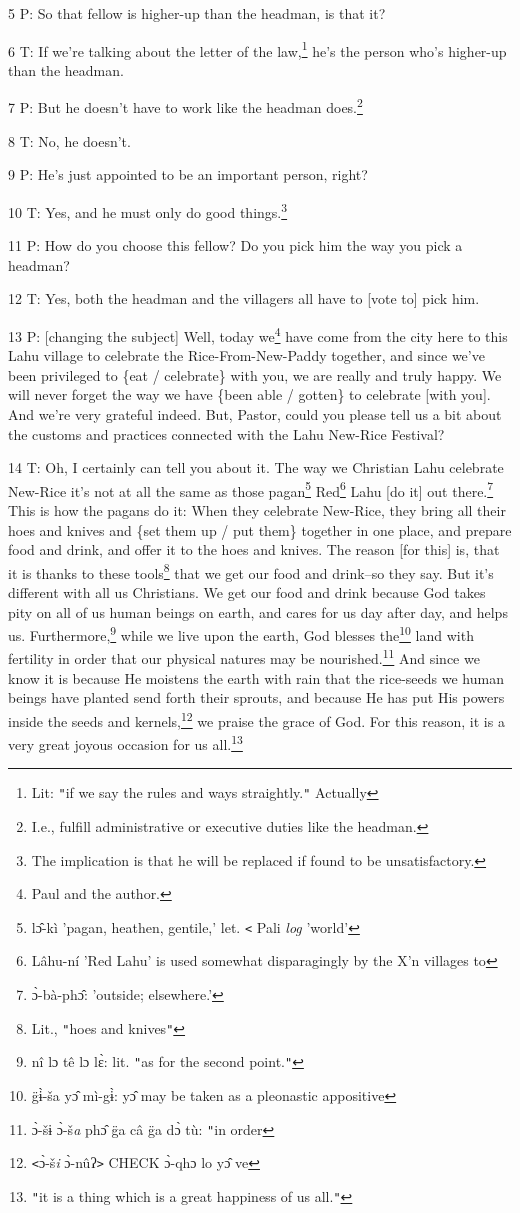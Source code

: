 5 P: So that fellow is higher-up than the headman, is that it?

6 T: If we're talking about the letter of the law,\footnote{Lit: \texttt{"}if we say the rules and ways straightly.\texttt{"} Actually} he's the person who's higher-up
than the headman.

7 P: But he doesn't have to work like the headman does.\footnote{I.e., fulfill administrative or executive duties like the headman.}

8 T: No, he doesn't.

9 P: He's just appointed to be an important person, right?

10 T: Yes, and he must only do good things.\footnote{The implication is that he will be replaced if found to be unsatisfactory.}

11 P: How do you choose this fellow? Do you pick him the way you pick a headman?

12 T: Yes, both the headman and the villagers all have to [vote to] pick him.

13 P: [changing the subject] Well, today we\footnote{Paul and the author.} have come from the city here to
this Lahu village to celebrate the Rice-From-New-Paddy together, and since we've
been privileged to \{eat / celebrate\} with you, we are really and truly happy.
We will never forget the way we have \{been able / gotten\} to celebrate [with
you]. And we're very grateful indeed. But, Pastor, could you please tell us a bit
about the customs and practices connected with the Lahu New-Rice Festival?

14 T: Oh, I certainly can tell you about it. The way we Christian Lahu celebrate
New-Rice it's not at all the same as those pagan\footnote{lɔ̂-kì 'pagan, heathen, gentile,' let. \texttt{<} Pali \textit{log} 'world'} Red\footnote{Lâhu-ní 'Red Lahu' is used somewhat disparagingly by the X'n villages to} Lahu [do it] out there.\footnote{ɔ̀-bà-phɔ̂: 'outside; elsewhere.'}
This is how the pagans do it: When they celebrate New-Rice, they bring all their
hoes and knives and \{set them up / put them\} together in one place, and prepare
food and drink, and offer it to the hoes and knives. The reason [for this] is,
that it is thanks to these tools\footnote{Lit., \texttt{"}hoes and knives\texttt{"}} that we get our food and drink--so they say.
But it's different with all us Christians. We get our food and drink because God
takes pity on all of us human beings on earth, and cares for us day after day,
and helps us. Furthermore,\footnote{nî lɔ tê lɔ lɛ̀: lit. \texttt{"}as for the second point.\texttt{"}} while we live upon the earth, God blesses the\footnote{g̈ɨ̀-ša yɔ̂ mì-gɨ̀: yɔ̂ may be taken as a pleonastic appositive}
land with fertility in order that our physical natures may be nourished.\footnote{ɔ̀-šɨ ɔ̀-š\emph{a} phɔ̂ g̈a câ g̈a dɔ̀ tù: \texttt{"}in order} And
since we know it is because He moistens the earth with rain that the rice-seeds
we human beings have planted send forth their sprouts, and because He has put His
powers inside the seeds and kernels,\footnote{\texttt{<}ɔ̀-š\emph{i} ɔ̀-nûʔ\texttt{>} CHECK ɔ̀-qhɔ lo yɔ̂ ve} we praise the grace of God. For this reason,
it is a very great joyous occasion for us all.\footnote{\texttt{"}it is a thing which is a great happiness of us all.\texttt{"}}

